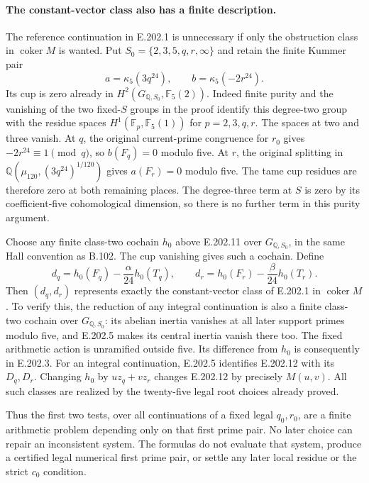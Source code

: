 \paragraph{The constant-vector class also has a finite description.}
The reference continuation in E.202.1 is unnecessary if only the
obstruction class in $\operatorname{coker}M$ is wanted.  Put
$S_0=\{2,3,5,q,r,\infty\}$ and retain the finite Kummer pair
\[
          a=\kappa_5(3q^{24}),\qquad
          b=\kappa_5(-2r^{24}).
 \tag{E.202.11}
\]
Its cup is zero already in
$H^2(G_{\mathbb Q,S_0},\mathbb F_5(2))$.
Indeed finite purity and the vanishing of the two fixed-$S$
groups in the proof identify this degree-two group with the
residue spaces $H^1(\mathbb F_p,\mathbb F_5(1))$ for
$p=2,3,q,r$.  The spaces at two and three vanish.  At $q$,
the original current-prime congruence for $r_0$ gives
$-2r^{24}\equiv1\pmod q$, so $b(F_q)=0$ modulo five.
At $r$, the original splitting in
$\mathbb Q(\mu_{120},(3q^{24})^{1/120})$ gives
$a(F_r)=0$ modulo five.  The tame cup residues are therefore
zero at both remaining places.  The degree-three term at $S$
is zero by its coefficient-five cohomological dimension, so
there is no further term in this purity argument.

Choose any finite class-two cochain $h_0$ above E.202.11 over
$G_{\mathbb Q,S_0}$, in the same Hall convention as B.102.
The cup vanishing gives such a cochain.  Define
\[
 d_q=h_0(F_q)-\frac{\alpha}{24}h_0(T_q),\qquad
 d_r=h_0(F_r)-\frac{\beta}{24}h_0(T_r).
 \tag{E.202.12}
\]
Then $(d_q,d_r)$ represents exactly the constant-vector class
of E.202.1 in $\operatorname{coker}M$.
To verify this, the reduction of any integral continuation is
also a finite class-two cochain over $G_{\mathbb Q,S_0}$:
its abelian inertia vanishes at all later support primes modulo
five, and E.202.5 makes its central inertia vanish there too.
The fixed arithmetic action is unramified outside five.
Its difference from $h_0$ is consequently in E.202.3.
For an integral continuation, E.202.5 identifies E.202.12 with
its $D_q,D_r$.  Changing $h_0$ by $u z_q+v z_r$ changes
E.202.12 by precisely $M(u,v)$.  All such classes are realized
by the twenty-five legal root choices already proved.

Thus the first two tests, over all continuations of a fixed legal
$q_0,r_0$, are a finite arithmetic problem depending only on
that first prime pair.  No later choice can repair an inconsistent
system.  The formulas do not evaluate that system, produce a
certified legal numerical first prime pair, or settle any later
local residue or the strict $c_0$ condition.
